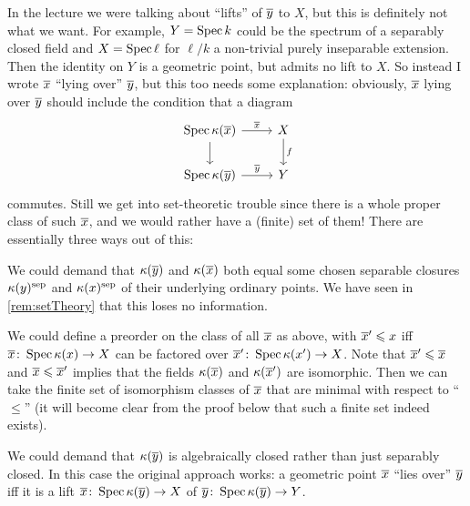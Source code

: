 \begin{rem*}\label{rem:WTFlyingOver}
	In the lecture we were talking about \enquote{lifts} of $\ov{y}$ to $X$, but this is definitely not what we want. For example, $Y=\operatorname{Spec} k$ could be the spectrum of a separably closed field and $X=\operatorname{Spec} \ell$ for $\ell/k$ a non-trivial purely inseparable extension. Then the identity on $Y$ is a geometric point, but admits no lift to $X$. So instead I wrote $\ov{x}$ \enquote{lying over} $\ov{y}$, but this too needs some explanation: obviously, $\ov{x}$ lying over $\ov{y}$ should include the condition that a diagram
	\begin{equation*}
		\begin{tikzcd}
		\Spec \kappa(\ov{x})\rar["\ov{x}"]\dar & X\dar["f"]\\
		\Spec \kappa(\ov{y})\rar["\ov{y}"] & Y
		\end{tikzcd}
	\end{equation*}
	commutes. Still we get into set-theoretic trouble since there is a whole proper class of such $\ov{x}$, and we would rather have a (finite) set of them! There are essentially three ways out of this:
	\begin{numerate}
		\item We could demand that $\kappa(\ov{y})$ and $\kappa(\ov{x})$ both equal some chosen separable closures $\kappa(y)^{\mathrm{sep}}$ and $\kappa(x)^{\mathrm{sep}}$ of their underlying ordinary points. We have seen in \cref{rem:setTheory} that this loses no information.
		\item We could define a preorder on the class of all $\ov{x}$ as above, with $\ov{x}'\leq x$ iff $\ov{x}\colon\Spec \kappa(x)\morphism X$ can be factored over $\ov{x}'\colon \Spec \kappa(x')\morphism X$. Note that $\ov{x}'\leq \ov{x}$ and $\ov{x}\leq \ov{x}'$ implies that the fields $\kappa(\ov{x})$ and $\kappa(\ov{x}')$ are isomorphic. Then we can take the finite set of isomorphism classes of $\ov{x}$ that are minimal with respect to \enquote{$\leq$} (it will become clear from the proof below that such a finite set indeed exists).
		\item We could demand that $\kappa(\ov{y})$ is algebraically closed rather than just separably closed. In this case the original approach works: a geometric point $\ov{x}$ \enquote{lies over} $\ov{y}$ iff it is a lift $\ov{x}\colon \Spec \kappa(\ov{y})\morphism X$ of $\ov{y}\colon \Spec \kappa(\ov{y})\morphism Y$.
	\end{numerate}
\end{rem*}
